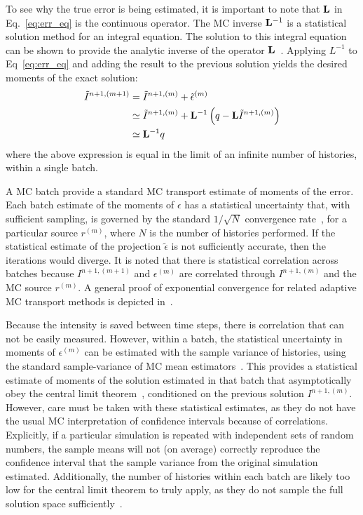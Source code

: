 To see why the true error is being estimated, it is important to note that 
$\mathbf{L}$ in Eq.~\eqref{eq:err_eq} is the continuous operator.  The MC inverse $\mathbf{L}^{-1}$ is
a statistical solution method for an integral equation.  The solution to this integral
equation can be shown to provide the analytic inverse of the operator $\mathbf{L}$~\cite{shultis_mc,cj_thesis}.  Applying $L^{-1}$ to Eq~\eqref{eq:err_eq} and adding the
result to the previous solution yields the desired moments of the exact solution:
\begin{align}
   \tilde I^{n+1,(m+1)} &= \tilde I^{n+1,(m)} + \tilde\epsilon^{(m)} \\
                  &\simeq  \tilde I^{n+1,(m)} + \mathbf{L}^{-1} \left(q - \mathbf{L} \tilde I^{n+1,(m)} \right) \\
                  &\simeq \mathbf{L}^{-1} q
\end{align}
where the above expression is equal in the limit of an infinite number of histories,
within a single batch.

A MC batch provide a standard MC transport estimate of moments of the error.  Each batch
estimate of the moments of $\epsilon$ has a statistical uncertainty that, with sufficient
sampling, is governed by the standard $1/\sqrt{N}$ convergence rate~\cite{shultis_mc}, for a
particular source $r^{(m)}$, where $N$ is the number of histories performed.  If the statistical estimate of the projection $\tilde\epsilon$ is not sufficiently
accurate, then the iterations would diverge. It is noted that there is statistical correlation across batches because
$I^{n+1,(m+1)}$ and $\epsilon^{(m)}$ are correlated through $I^{n+1,(m)}$ and the MC source $r^{(m)}$.  
A general proof of exponential
convergence for related adaptive MC transport methods is depicted in~\cite{spanier_mc}.  

Because the intensity is saved between time steps, there is correlation that
can not be easily measured.  However, within a batch, the statistical uncertainty in moments of $\epsilon^{(m)}$ can be estimated with the
sample variance of histories, using the standard sample-variance of MC mean
estimators~\cite{shultis_mc}.  This provides a statistical estimate of moments
of the solution estimated in that batch that asymptotically obey the central
limit theorem~\cite{shultis_mc}, conditioned on the previous solution
$I^{n+1,(m)}$.  However, care must be taken with these statistical estimates,
as they do not have the usual MC interpretation of confidence intervals because
of correlations.  Explicitly, if a particular simulation is repeated with
independent sets of random numbers, the sample means will not (on average)
correctly reproduce the confidence interval that the sample variance from the
original simulation estimated.  Additionally, the number of histories within
each batch are likely too low  for the central limit theorem to truly apply, as
they  do not sample the full solution space sufficiently~\cite{mcnp}.  

